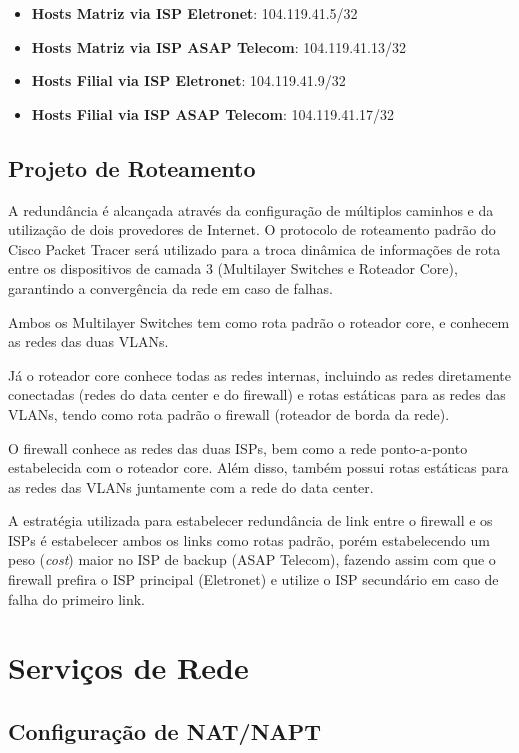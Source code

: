 \documentclass[a4paper, 12pt]{article}
\begin{document}
\begin{itemize}
    \item \textbf{Hosts Matriz via ISP Eletronet}: 104.119.41.5/32
    \item \textbf{Hosts Matriz via ISP ASAP Telecom}: 104.119.41.13/32
    \item \textbf{Hosts Filial via ISP Eletronet}: 104.119.41.9/32
    \item \textbf{Hosts Filial via ISP ASAP Telecom}: 104.119.41.17/32
\end{itemize}


\subsection{Projeto de Roteamento}
\label{subsec:roteamento}

A redundância é alcançada através da configuração de múltiplos caminhos e da utilização de dois provedores de Internet. O protocolo de roteamento padrão do Cisco Packet Tracer será utilizado para a troca dinâmica de informações de rota entre os dispositivos de camada 3 (Multilayer Switches e Roteador Core), garantindo a convergência da rede em caso de falhas.

Ambos os Multilayer Switches tem como rota padrão o roteador core, e conhecem as redes das duas VLANs.

Já o roteador core conhece todas as redes internas, incluindo as redes diretamente conectadas (redes do data center e do firewall) e rotas estáticas para as redes das VLANs, tendo como rota padrão o firewall (roteador de borda da rede).

O firewall conhece as redes das duas ISPs, bem como a rede ponto-a-ponto estabelecida com o roteador core. Além disso, também possui rotas estáticas para as redes das VLANs juntamente com a rede do data center.

A estratégia utilizada para estabelecer redundância de link entre o firewall e os ISPs é estabelecer ambos os links como rotas padrão, porém estabelecendo um peso (\textit{cost}) maior no ISP de backup (ASAP Telecom), fazendo assim com que o firewall prefira o ISP principal (Eletronet) e utilize o ISP secundário em caso de falha do primeiro link.

\section{Serviços de Rede}
\label{sec:servicos}

\subsection{Configuração de NAT/NAPT}
\label{subsec:nat}
\end{document}
